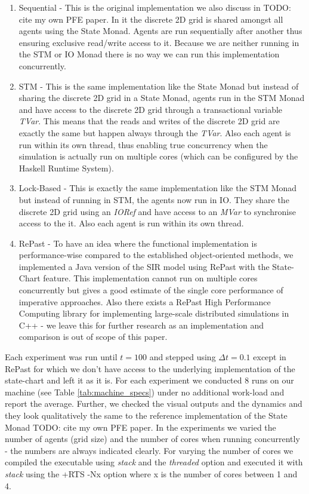 \begin{enumerate}
	\item Sequential - This is the original implementation we also discuss in TODO: cite my own PFE paper. In it the discrete 2D grid is shared amongst all agents using the State Monad. Agents are run sequentially after another thus ensuring exclusive read/write access to it. Because we are neither running in the STM or IO Monad there is no way we can run this implementation concurrently.
	\item STM - This is the same implementation like the State Monad but instead of sharing the discrete 2D grid in a State Monad, agents run in the STM Monad and have access to the discrete 2D grid through a transactional variable \textit{TVar}. This means that the reads and writes of the discrete 2D grid are exactly the same but happen always through the \textit{TVar}. Also each agent is run within its own thread, thus enabling true concurrency when the simulation is actually run on multiple cores (which can be configured by the Haskell Runtime System).
	\item Lock-Based - This is exactly the same implementation like the STM Monad but instead of running in STM, the agents now run in IO. They share the discrete 2D grid using an \textit{IORef} and have access to an \textit{MVar} to synchronise access to the it. Also each agent is run within its own thread.
	\item RePast - To have an idea where the functional implementation is performance-wise compared to the established object-oriented methods, we implemented a Java version of the SIR model using RePast with the State-Chart feature. This implementation cannot run on multiple cores concurrently but gives a good estimate of the single core performance of imperative approaches. Also there exists a RePast High Performance Computing library for implementing large-scale distributed simulations in C++ - we leave this for further research as an implementation and comparison is out of scope of this paper.
\end{enumerate}

Each experiment was run until $t = 100$ and stepped using $\Delta t = 0.1$ except in RePast for which we don't have access to the underlying implementation of the state-chart and left it as it is. For each experiment we conducted 8 runs on our machine (see Table \ref{tab:machine_specs}) under no additional work-load and report the average. Further, we checked the visual outputs and the dynamics and they look qualitatively the same to the reference implementation of the State Monad TODO: cite my own PFE paper. In the experiments we varied the number of agents (grid size) and the number of cores when running concurrently - the numbers are always indicated clearly. For varying the number of cores we compiled the executable using \textit{stack} and the \textit{threaded} option and executed it with \textit{stack} using the +RTS -Nx option where x is the number of cores between 1 and 4. 

